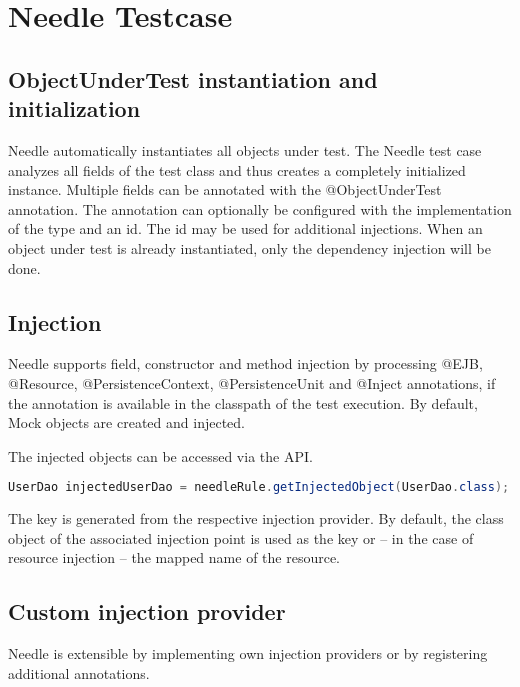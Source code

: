\chapter{Needle Testcase}

\section{ObjectUnderTest instantiation and initialization}
\label{sec: ObjectUnderTest}

Needle automatically instantiates all objects under test. The Needle test case analyzes all fields of the test class and thus creates a completely initialized instance.
Multiple fields can be annotated with the @ObjectUnderTest annotation. The annotation can optionally be configured with the implementation of the type and an id.
The id may be used for additional injections. When an object under test is already instantiated, only the dependency injection will be done.


\section{Injection}
\label{sec:Injection}

Needle supports field, constructor and method injection by processing @EJB, @Resource, @PersistenceContext, @PersistenceUnit
and @Inject annotations, if the annotation is available in the classpath of the test execution. By default, Mock objects are created and injected.

The injected objects can be accessed via the API.

\begin{lstlisting}[language={JAVA},caption=Injected Components]
UserDao injectedUserDao = needleRule.getInjectedObject(UserDao.class);
\end{lstlisting}

The key is generated from the respective injection provider. By default, the class object of the associated injection point is used as the key or
-- in the case of resource injection -- the mapped name of the resource.


\section{Custom injection provider}
\label{sec:Custom injection provider}

Needle is extensible by implementing own injection providers or by registering additional annotations.

